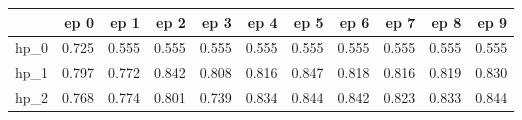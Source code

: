 \begin{tabular}{lrrrrrrrrrr}
\toprule
{} &   ep 0 &   ep 1 &   ep 2 &   ep 3 &   ep 4 &   ep 5 &   ep 6 &   ep 7 &   ep 8 &   ep 9 \\
\midrule
hp\_0 &  0.725 &  0.555 &  0.555 &  0.555 &  0.555 &  0.555 &  0.555 &  0.555 &  0.555 &  0.555 \\
hp\_1 &  0.797 &  0.772 &  0.842 &  0.808 &  0.816 &  0.847 &  0.818 &  0.816 &  0.819 &  0.830 \\
hp\_2 &  0.768 &  0.774 &  0.801 &  0.739 &  0.834 &  0.844 &  0.842 &  0.823 &  0.833 &  0.844 \\
\bottomrule
\end{tabular}
